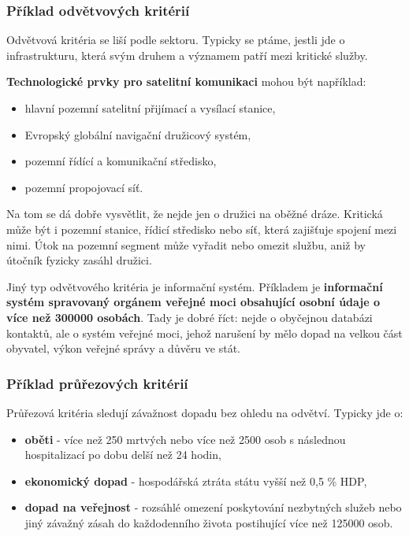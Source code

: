 \subsubsection*{Příklad odvětvových kritérií}
Odvětvová kritéria se liší podle sektoru. Typicky se ptáme, jestli jde o infrastrukturu, která svým druhem a významem patří mezi kritické služby.

\textbf{Technologické prvky pro satelitní komunikaci} mohou být například:
\begin{itemize}
  \item hlavní pozemní satelitní přijímací a vysílací stanice,
  \item Evropský globální navigační družicový systém,
  \item pozemní řídící a komunikační středisko,
  \item pozemní propojovací síť.
\end{itemize}
Na tom se dá dobře vysvětlit, že nejde jen o družici na oběžné dráze. Kritická může být i pozemní stanice, řídicí středisko nebo síť, která zajišťuje spojení mezi nimi. Útok na pozemní segment může vyřadit nebo omezit službu, aniž by útočník fyzicky zasáhl družici.

Jiný typ odvětvového kritéria je informační systém. Příkladem je \textbf{informační systém spravovaný orgánem veřejné moci obsahující osobní údaje o více než 300000 osobách}. Tady je dobré říct: nejde o obyčejnou databázi kontaktů, ale o systém veřejné moci, jehož narušení by mělo dopad na velkou část obyvatel, výkon veřejné správy a důvěru ve stát.

\subsubsection*{Příklad průřezových kritérií}
Průřezová kritéria sledují závažnost dopadu bez ohledu na odvětví. Typicky jde o:
\begin{itemize}
  \item \textbf{oběti} - více než 250 mrtvých nebo více než 2500 osob s následnou hospitalizací po dobu delší než 24 hodin,
  \item \textbf{ekonomický dopad} - hospodářská ztráta státu vyšší než 0,5 \% HDP,
  \item \textbf{dopad na veřejnost} - rozsáhlé omezení poskytování nezbytných služeb nebo jiný závažný zásah do každodenního života postihující více než 125000 osob.
\end{itemize}


